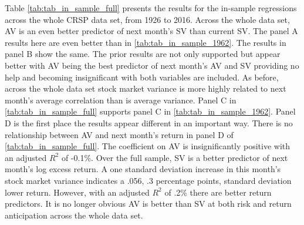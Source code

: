Table \ref{tab:tab_in_sample_full} presents the results for the in-sample regressions across the whole CRSP data set, from 1926 to 2016. Across the whole data set, AV is an even better predictor of next month's SV than current SV. The panel A results here are even better than in \ref{tab:tab_in_sample_1962}. The results in panel B show the same. The prior results are not only supported but appear better with AV being the best predictor of next month's AV and SV providing no help and becoming insignificant with both variables are included. As before, across the whole data set stock market variance is more highly related to next month's average correlation than is average variance. Panel C in \ref{tab:tab_in_sample_full} supports panel C in \ref{tab:tab_in_sample_1962}. Panel D is the first place the results appear different in an important way. There is no relationship between AV and next month's return in panel D of \ref{tab:tab_in_sample_full}. The coefficient on AV is insignificantly positive with an adjusted $R^{2}$ of -0.1\%. Over the full sample, SV is a better predictor of next month's log excess return. A one standard deviation increase in this month's stock market variance indicates a .056, .3 percentage points, standard deviation lower return. However, with an adjusted $R^{2}$ of .2\% there are better return predictors. It is no longer obvious AV is better than SV at both risk and return anticipation across the whole data set.

